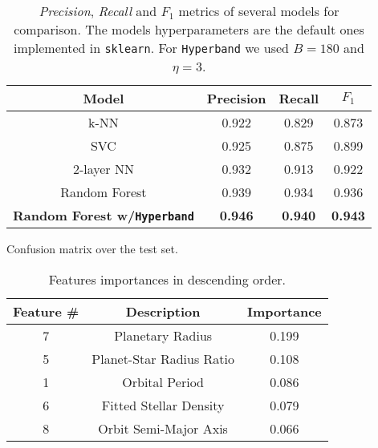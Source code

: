 \documentclass[11pt, a4paper]{article}
\begin{document}
  \begin{table}
    \centering
    \begin{tabular}{|c c c c|}
      \hline
      Model & Precision & Recall & $F_{1}$  \\
      \hline\hline
      k-NN & 0.922 & 0.829 & 0.873 \\
      \hline
      SVC & 0.925 & 0.875 & 0.899 \\
      \hline
      2-layer NN & 0.932 & 0.913 & 0.922 \\
      \hline
      Random Forest & 0.939 & 0.934 & 0.936 \\
      \hline
      \textbf{Random Forest w/\texttt{Hyperband}} & \textbf{0.946} & \textbf{0.940} & \textbf{0.943} \\
      \hline
    \end{tabular}
    \caption{\textit{Precision}, \textit{Recall} and $F_{1}$ metrics of several models for comparison. The models hyperparameters are the default ones implemented in \texttt{sklearn}. For \texttt{Hyperband} we used $B=180$ and $\eta=3$.}
    \label{table:benchmark}
  \end{table}
  
  \begin{table}
    \centering
    \caption{Confusion matrix over the test set.}
    \label{table:confusion}
  \end{table}

  \begin{table}
    \centering
    \begin{tabular}{|c c c|}
    \hline
    Feature \# & Description & Importance \\
    \hline\hline
    7 & Planetary Radius & 0.199 \\
    5 & Planet-Star Radius Ratio & 0.108 \\
    1 & Orbital Period & 0.086 \\
    6 & Fitted Stellar Density & 0.079 \\
    8 & Orbit Semi-Major Axis & 0.066 \\
    \hline
    \end{tabular}
    \caption{Features importances in descending order.}
    \label{table:importances}
  \end{table}
\end{document}
